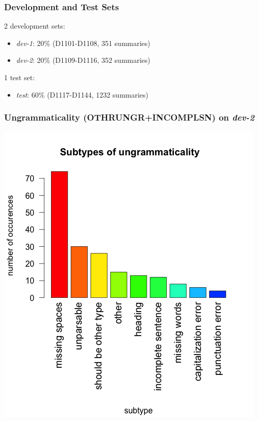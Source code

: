 \documentclass[table]{beamer}
\begin{document}
\begin{frame}
  \frametitle{Development and Test Sets}
  2 development sets:
  \begin{itemize}
    \item \textit{dev-1}: 20\% (D1101-D1108, 351 summaries)
    \item \textit{dev-2}: 20\% (D1109-D1116, 352 summaries)
  \end{itemize}

  \vspace{1cm}
  1 test set: 
  \begin{itemize}
    \item \textit{test}: 60\% (D1117-D1144, 1232 summaries)
  \end{itemize}
\end{frame}

\begin{frame}
  \frametitle{Ungrammaticality (OTHRUNGR+INCOMPLSN) on \textit{dev-2}}
  \begin{center}
    \includegraphics[scale=0.4]{subtypes_dev2.png}
  \end{center}
\end{frame}
\end{document}
